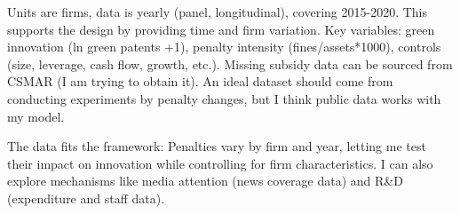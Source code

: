 \documentclass[12pt]{article}
\begin{document}
Units are firms, data is yearly (panel, longitudinal), covering 2015-2020. This supports the design by providing time and firm variation. Key variables: green innovation (ln green patents +1), penalty intensity (fines/assets*1000), controls (size, leverage, cash flow, growth, etc.). Missing subsidy data can be sourced from CSMAR (I am trying to obtain it). An ideal dataset should come from conducting experiments by penalty changes, but I think public data works with my model.

The data fits the framework: Penalties vary by firm and year, letting me test their impact on innovation while controlling for firm characteristics. I can also explore mechanisms like media attention (news coverage data) and R\&D (expenditure and staff data).
\end{document}
